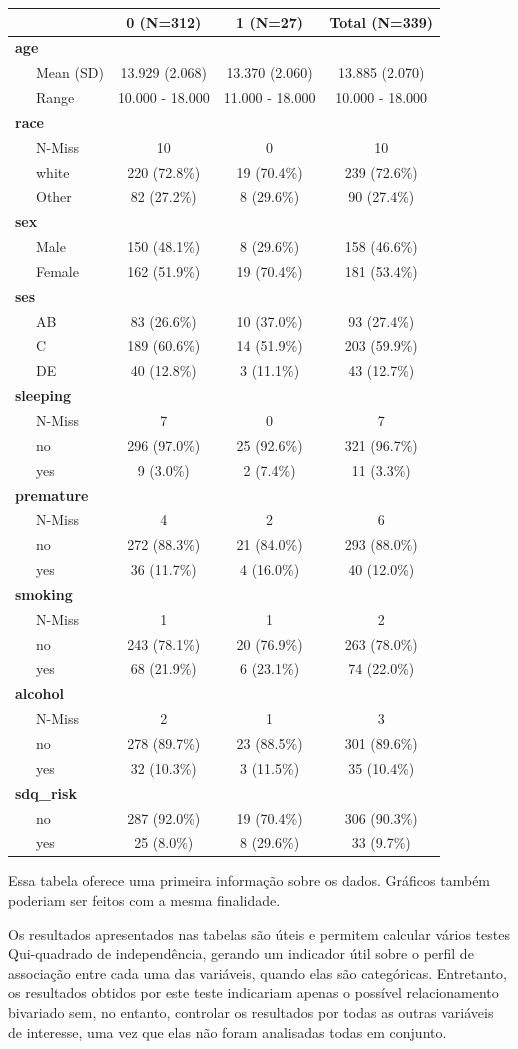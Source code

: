 \documentclass[
]{book}
\begin{document}
\begin{longtable}[]{@{}lccc@{}}
\toprule
& 0 (N=312) & 1 (N=27) & Total (N=339)\tabularnewline
\midrule
\endhead
\textbf{age} & & &\tabularnewline
~~~Mean (SD) & 13.929 (2.068) & 13.370 (2.060) & 13.885 (2.070)\tabularnewline
~~~Range & 10.000 - 18.000 & 11.000 - 18.000 & 10.000 - 18.000\tabularnewline
\textbf{race} & & &\tabularnewline
~~~N-Miss & 10 & 0 & 10\tabularnewline
~~~white & 220 (72.8\%) & 19 (70.4\%) & 239 (72.6\%)\tabularnewline
~~~Other & 82 (27.2\%) & 8 (29.6\%) & 90 (27.4\%)\tabularnewline
\textbf{sex} & & &\tabularnewline
~~~Male & 150 (48.1\%) & 8 (29.6\%) & 158 (46.6\%)\tabularnewline
~~~Female & 162 (51.9\%) & 19 (70.4\%) & 181 (53.4\%)\tabularnewline
\textbf{ses} & & &\tabularnewline
~~~AB & 83 (26.6\%) & 10 (37.0\%) & 93 (27.4\%)\tabularnewline
~~~C & 189 (60.6\%) & 14 (51.9\%) & 203 (59.9\%)\tabularnewline
~~~DE & 40 (12.8\%) & 3 (11.1\%) & 43 (12.7\%)\tabularnewline
\textbf{sleeping} & & &\tabularnewline
~~~N-Miss & 7 & 0 & 7\tabularnewline
~~~no & 296 (97.0\%) & 25 (92.6\%) & 321 (96.7\%)\tabularnewline
~~~yes & 9 (3.0\%) & 2 (7.4\%) & 11 (3.3\%)\tabularnewline
\textbf{premature} & & &\tabularnewline
~~~N-Miss & 4 & 2 & 6\tabularnewline
~~~no & 272 (88.3\%) & 21 (84.0\%) & 293 (88.0\%)\tabularnewline
~~~yes & 36 (11.7\%) & 4 (16.0\%) & 40 (12.0\%)\tabularnewline
\textbf{smoking} & & &\tabularnewline
~~~N-Miss & 1 & 1 & 2\tabularnewline
~~~no & 243 (78.1\%) & 20 (76.9\%) & 263 (78.0\%)\tabularnewline
~~~yes & 68 (21.9\%) & 6 (23.1\%) & 74 (22.0\%)\tabularnewline
\textbf{alcohol} & & &\tabularnewline
~~~N-Miss & 2 & 1 & 3\tabularnewline
~~~no & 278 (89.7\%) & 23 (88.5\%) & 301 (89.6\%)\tabularnewline
~~~yes & 32 (10.3\%) & 3 (11.5\%) & 35 (10.4\%)\tabularnewline
\textbf{sdq\_risk} & & &\tabularnewline
~~~no & 287 (92.0\%) & 19 (70.4\%) & 306 (90.3\%)\tabularnewline
~~~yes & 25 (8.0\%) & 8 (29.6\%) & 33 (9.7\%)\tabularnewline
\bottomrule
\end{longtable}

Essa tabela oferece uma primeira informação sobre os dados. Gráficos também poderiam ser feitos com a mesma finalidade.

Os resultados apresentados nas tabelas são úteis e permitem calcular vários testes Qui-quadrado de independência, gerando um indicador útil sobre o perfil de associação entre cada uma das variáveis, quando elas são categóricas. Entretanto, os resultados obtidos por este teste indicariam apenas o possível relacionamento bivariado sem, no entanto, controlar os resultados por todas as outras variáveis de interesse, uma vez que elas não foram analisadas todas em conjunto.
\end{document}
